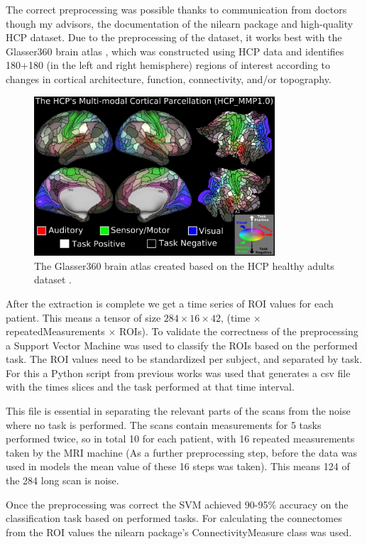 	The correct preprocessing was possible thanks to communication from doctors though my advisors, the documentation of the nilearn package and high-quality HCP dataset. Due to the preprocessing of the dataset, it works best with the Glasser360 brain atlas \cite{sporns2005human}, which was constructed using HCP data and identifies 180+180 (in the left and right hemisphere) regions of interest according to changes in cortical architecture, function, connectivity, and/or topography.

	\begin{figure}[!h]
		\centering
		\includegraphics[width=0.8\textwidth]{figures/atlas.png}
		\caption{The Glasser360 brain atlas created based on the HCP healthy adults dataset \cite{sporns2005human}.}
	\end{figure}

	After the extraction is complete we get a time series of ROI values for each patient. This means a tensor of size $284 \times 16 \times 42$, (time $\times$ repeatedMeasurements $\times$ ROIs). To validate the correctness of the preprocessing a Support Vector Machine was used to classify the ROIs based on the performed task. The ROI values need to be standardized per subject, and separated by task. For this a Python script from previous works was used that generates a csv file with the times slices and the task performed at that time interval. 
	
	This file is essential in separating the relevant parts of the scans from the noise where no task is performed. The scans contain measurements for 5 tasks performed twice, so in total 10 for	each patient, with 16 repeated measurements taken by the MRI machine (As a further preprocessing step, before the data was used in models the mean value of these 16 steps was taken). This means 124 of the 284 long scan is noise.
	
	Once the preprocessing was correct the SVM achieved 90-95\% accuracy on the classification task based on performed tasks. For calculating the connectomes from the ROI values the nilearn package’s ConnectivityMeasure class was used. 
	
